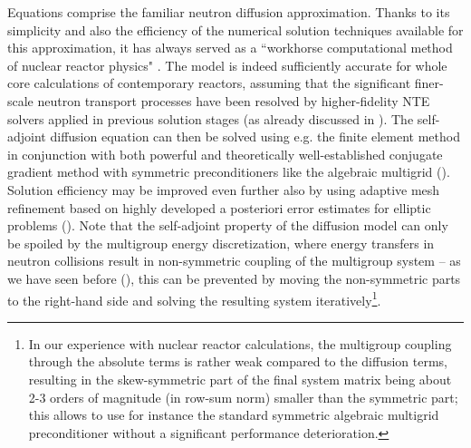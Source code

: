 Equations  comprise the familiar neutron diffusion approximation. 
Thanks to its simplicity and also the efficiency of the numerical solution techniques available for this approximation,
it has always served as a ``workhorse computational method of nuclear reactor physics" \cite[p. 43]{Stacey1}. The model is indeed sufficiently accurate for whole core calculations of contemporary reactors, assuming that the significant finer-scale neutron transport processes have been 
resolved by higher-fidelity NTE solvers applied in previous solution stages (as already discussed in ).
The self-adjoint diffusion equation can then be solved using e.g. the finite element method in conjunction with both
powerful and theoretically well-established conjugate gradient method with symmetric preconditioners like the
algebraic multigrid (\cite{vanek1,vanek2}). Solution efficiency may be improved even further also by using adaptive mesh
refinement based on highly developed a posteriori error estimates for elliptic problems (\cite{gratsch,Solin1,
demkowicz}).
Note that the self-adjoint property of the diffusion model can only be spoiled by the multigroup energy discretization, where energy 
transfers in neutron collisions result in non-symmetric coupling of the multigroup system -- as we have seen before 
(), this can be prevented by moving the non-symmetric parts to the right-hand side and solving the 
resulting system iteratively\footnote{In our experience with nuclear reactor calculations, the multigroup coupling through the absolute
terms is rather weak compared to the diffusion terms, resulting in the skew-symmetric part of the final system matrix
being about 2-3 orders of magnitude (in row-sum norm) smaller than the symmetric part; this allows to use for instance
the standard symmetric algebraic multigrid preconditioner without a significant performance deterioration.}.

